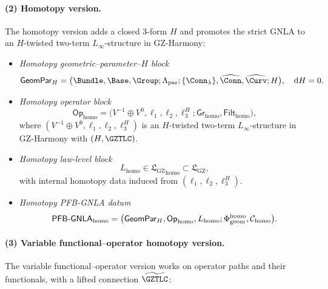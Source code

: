 \documentclass[11pt]{book}
\theoremstyle{plain}
\theoremstyle{definition}
\newcommand{\GZLS}{\ensuremath{\mathfrak{L}_{\mathrm{GZ}}}}       \newcommand{\GZLT}{\ensuremath{M_{!w}}}                           \newcommand{\GZLOC}{\ensuremath{A_M}}                             \newcommand{\GZLCurv}{\ensuremath{\mathcal{F}_{\mathrm{law}}}}
\begin{document}
\paragraph{(2) Homotopy version.}

The homotopy version adds a closed 3-form $H$ and promotes the strict
GNLA to an $H$-twisted two-term $L_\infty$-structure in GZ-Harmony:

\begin{itemize}
  \item \emph{Homotopy geometric--parameter--$H$ block}
    \[
      \mathsf{GeomPar}_H
      =
      \bigl(
        \Bundle,\Base,\Group;
        \Lambda_{\mathrm{par}};
        \{\Conn_\lambda\},
        \widehat{\Conn},\widehat{\Curv};
        H
      \bigr),
      \quad \mathrm{d}H=0.
    \]
  \item \emph{Homotopy operator block}
    \[
      \mathsf{Op}_{\mathrm{homo}}
      =
      \bigl(
        V^{-1}\oplus V^0,
        \ell_1,\ell_2,\ell_3^H;
        \mathsf{Gr}_{\mathrm{homo}},
        \mathsf{Filt}_{\mathrm{homo}}
      \bigr),
    \]
    where $(V^{-1}\oplus V^0,\ell_1,\ell_2,\ell_3^H)$ is an
    $H$-twisted two-term $L_\infty$-structure in GZ-Harmony with
    $(H,\GZTLC)$.
  \item \emph{Homotopy law-level block}
    \[
      L_{\mathrm{homo}}
      \in
      {\GZLS}_{\mathrm{homo}}
      \subset\GZLS,
    \]
    with internal homotopy data induced from
    $(\ell_1,\ell_2,\ell_3^H)$.
  \item \emph{Homotopy PFB-GNLA datum}
    \[
      \mathsf{PFB\text- GNLA}_{\mathrm{homo}}
      =
      \bigl(
        \mathsf{GeomPar}_H,
        \mathsf{Op}_{\mathrm{homo}},
        L_{\mathrm{homo}};
        \Phi_{\mathrm{geom}}^{\mathrm{homo}},
        \mathcal{C}_{\mathrm{homo}}
      \bigr).
    \]
\end{itemize}

\paragraph{(3) Variable functional--operator homotopy version.}

The variable functional--operator version works on operator paths and
their functionals, with a lifted connection $\widetilde{\GZTLC}$:
\end{document}
